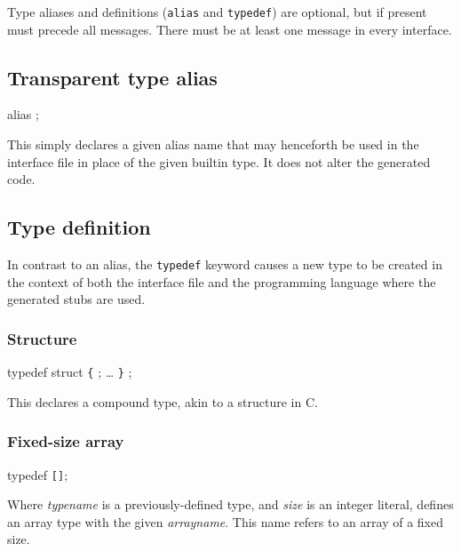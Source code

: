 \documentclass[a4paper,twoside]{report} %
\begin{document}
Type aliases and definitions (\texttt{alias} and \texttt{typedef}) are
optional, but if present must precede all messages. There must be at least
one message in every interface.

\subsection{Transparent type alias}\label{sec:lang:alias}

\begin{syntax}
alias  ;
\end{syntax}

This simply declares a given alias name that may henceforth be used in the
interface file in place of the given builtin type. It does not alter the
generated code.

\subsection{Type definition}\label{sec:lang:typedef}

In contrast to an alias, the \texttt{typedef} keyword causes a new type
to be created in the context of both the interface file and the programming
language where the generated stubs are used.

\subsubsection{Structure}

\begin{syntax}
typedef struct \verb+{+
   ;
  \ldots
\verb+}+ ;
\end{syntax}

This declares a compound type, akin to a structure in C.

\subsubsection{Fixed-size array}

\begin{syntax}
typedef  \verb+[+\verb+]+;
\end{syntax}

Where \emph{typename} is a previously-defined type, and \emph{size} is an
integer literal, defines an array type with the given \emph{arrayname}. This
name refers to an array of a fixed size.
\end{document}
